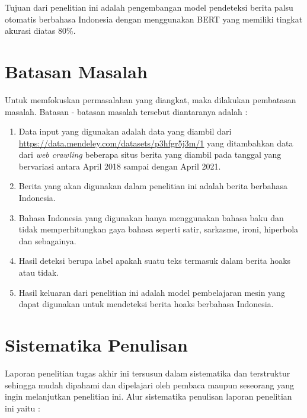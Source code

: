 Tujuan dari penelitian ini adalah pengembangan model pendeteksi berita palsu otomatis berbahasa Indonesia dengan menggunakan BERT yang memiliki tingkat akurasi diatas 80\%.

\section{Batasan Masalah}
\label{sec:batasanmasalah}

Untuk memfokuskan permasalahan yang diangkat, maka dilakukan pembatasan masalah. Batasan - batasan masalah tersebut diantaranya adalah :

\begin{enumerate}[itemsep=-0.2em]
      \item Data input yang digunakan adalah data yang diambil dari \url{https://data.mendeley.com/datasets/p3hfgr5j3m/1} yang ditambahkan data dari \textit{web crawling} beberapa situs berita yang diambil pada tanggal yang bervariasi antara April 2018 sampai dengan April 2021.

      \item Berita yang akan digunakan dalam penelitian ini adalah berita berbahasa Indonesia.

      \item Bahasa Indonesia yang digunakan hanya menggunakan bahasa baku dan tidak memperhitungkan gaya bahasa seperti satir, sarkasme, ironi, hiperbola dan sebagainya.

      \item Hasil deteksi berupa label apakah suatu teks termasuk dalam berita hoaks atau tidak.

      \item Hasil keluaran dari penelitian ini adalah model pembelajaran mesin yang dapat digunakan untuk mendeteksi berita hoaks berbahasa Indonesia.

\end{enumerate}

\section{Sistematika Penulisan}
\label{sec:sistematikapenulisan}

Laporan penelitian tugas akhir ini tersusun dalam sistematika dan terstruktur sehingga mudah dipahami dan dipelajari oleh pembaca maupun seseorang yang ingin melanjutkan penelitian ini. Alur sistematika penulisan laporan penelitian ini yaitu :

